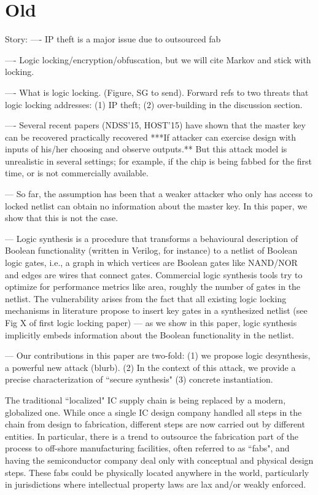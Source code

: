 \section{Old}
Story:
 ---- IP theft is a major issue due to outsourced fab
 
 ---- Logic locking/encryption/obfuscation, but we will cite Markov and stick with locking.
 
 ---- What is logic locking. (Figure, SG to send). Forward refs 
 to two threats that logic locking addresses: (1) IP theft; (2) over-building in the discussion section.
 
 ---- Several recent papers (NDSS'15, HOST'15) have shown that the master key can be recovered practically recovered ***If attacker can exercise design with inputs of his/her choosing and observe outputs.** But this attack model is unrealistic in several settings; for example, if the chip is being fabbed for the first time, or is not commercially available. 
 
 --- So far, the assumption has been that a weaker attacker who only has access to locked netlist can obtain no information about the master key. In this paper, we show that this is not the case. 
 
 
--- Logic synthesis is a procedure that transforms a behavioural description of Boolean functionality (written in Verilog, for instance) to a netlist of Boolean logic gates, i.e., a graph in which vertices are Boolean gates like NAND/NOR and edges are wires that connect gates. Commercial logic synthesis tools try to optimize for performance metrics like area, roughly the number of gates in the netlist. The vulnerability arises from the fact that all existing 
logic locking mechanisms in literature propose to insert key gates 
in a synthesized netlist (see Fig X of first logic locking paper) 
--- as we show in this paper, logic synthesis implicitly embeds information about the Boolean functionality in the netlist. 

--- Our contributions in this paper are two-fold: 
(1) we propose logic desynthesis, a 
powerful new attack (blurb). 
(2) In the context of this attack, we provide a 
precise 
characterization of ``secure synthesis" 
(3) concrete instantiation.







 
 
 
 
 
 
The traditional ``localized" IC supply chain is being replaced by a modern, globalized one. While once a single IC design company handled all steps in the chain from design to fabrication, different steps are now carried out by different entities. In particular, there is a trend to outsource the fabrication part of the process to off-shore manufacturing facilities, often referred to as ``fabs", and having the semiconductor company deal only with conceptual and physical design steps. These fabs could be physically located anywhere in the world, particularly in jurisdictions where intellectual property laws are lax  and/or weakly enforced.

